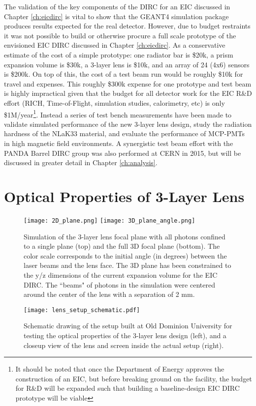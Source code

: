 \label{ch:components}
The validation of the key components of the DIRC for an EIC discussed in Chapter \ref{ch:eicdirc} is vital to show that the GEANT4 simulation package produces results expected for the real detector. However, due to budget restraints it was not possible to build or otherwise procure a full scale prototype of the envisioned EIC DIRC discussed in Chapter \ref{ch:eicdirc}. As a conservative estimate of the cost of a simple prototype: one radiator bar is \$20k, a prism expansion volume is \$30k, a 3-layer lens is \$10k, and an array of 24 (4x6) sensors is \$200k. On top of this, the cost of a test beam run would be roughly \$10k for travel and expenses.  This roughly \$300k expense for one prototype and test beam is highly impractical given that the budget for all detector work for the EIC R\&D effort (RICH, Time-of-Flight, simulation studies, calorimetry, etc) is only \$1M/year\footnote{It should be noted that once the Department of Energy approves the construction of an EIC, but before breaking ground on the facility, the budget for R\&D will be expanded such that building a baseline-design EIC DIRC prototype will be viable}. Instead a series of test bench measurements have been made to validate simulated performance of the new 3-layer lens design, study the radiation hardness of the NLaK33 material, and evaluate the performance of MCP-PMTs in high magnetic field environments. A synergistic test beam effort with the PANDA Barrel DIRC group was also performed at CERN in 2015, but will be discussed in greater detail in Chapter \ref{ch:analysis}.

\section{Optical Properties of 3-Layer Lens}
\begin{figure}[!htb]
	\centering
	\texttt{[image: 2D\_plane.png]}
	\texttt{[image: 3D\_plane\_angle.png]}
	\caption{Simulation of the 3-layer lens focal plane with all photons confined to a single plane (top) and the full 3D focal plane (bottom). The color scale corresponds to the initial angle (in degrees) between the laser beams and the lens face. The 3D plane has been constrained to the y/z dimensions of the current expansion volume for the EIC DIRC. The ``beams" of photons in the simulation were centered around the center of the lens with a separation of 2 mm.}
	\label{fig:focalplane_sim}
\end{figure}
\begin{figure}[!htb]
	\centering
	\texttt{[image: lens\_setup\_schematic.pdf]}
	\caption{Schematic drawing of the setup built at Old Dominion University for testing the optical properties of the 3-layer lens design (left), and a closeup view of the lens and screen inside the actual setup (right).}
	\label{fig:ODU_setup}
\end{figure}

